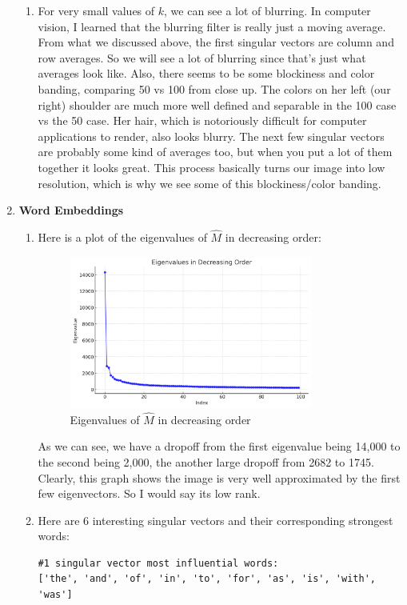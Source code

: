 \documentclass[12pt]{article}
\theoremstyle{definitionstyle}
\begin{document}
\begin{enumerate}[leftmargin=\labelsep]
\begin{enumerate}[label=\textbf{(\alph*)}]
            \item For very small values of $k$, we can see a lot of blurring. In computer vision, I learned that the blurring filter is really just a moving average. From what we discussed above, the first singular vectors are column and row averages. So we will see a lot of blurring since that's just what averages look like. Also, there seems to be some blockiness and color banding, comparing 50 vs 100 from close up. The colors on her left (our right) shoulder are much more well defined and separable in the 100 case vs the 50 case. Her hair, which is notoriously difficult for computer applications to render, also looks blurry. The next few singular vectors are probably some kind of averages too, but when you put a lot of them together it looks great. This process basically turns our image into low resolution, which is why we see some of this blockiness/color banding. 
        \end{enumerate}
        \item \textbf{Word Embeddings}
        \begin{enumerate}[label=\textbf{(\alph*)}]
            \item Here is a plot of the eigenvalues of $\hat M$ in decreasing order:
            \begin{figure}[H]
                \centering
                \includegraphics[width=0.8\textwidth]{eigvals_dec_order.png}
                \caption{Eigenvalues of $\hat M$ in decreasing order}
            \end{figure}
            As we can see, we have a dropoff from the first eigenvalue being 14,000 to the second being 2,000, the another large dropoff from 2682 to 1745. Clearly, this graph shows the image is very well approximated by the first few eigenvectors. So I would say its low rank.

            \item Here are 6 interesting singular vectors and their corresponding strongest words:
            \begin{lstlisting}
#1 singular vector most influential words:  
['the', 'and', 'of', 'in', 'to', 'for', 'as', 'is', 'with', 'was']
                \end{lstlisting}


\end{enumerate}
\end{enumerate}
\end{document}

